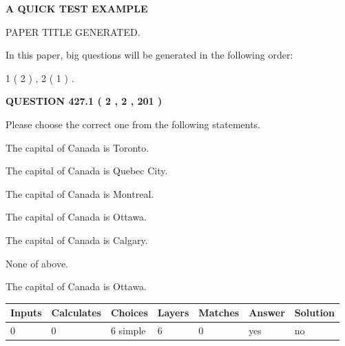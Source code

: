 \documentclass[12pt]{article}
\begin{document}
   
 \vspace{0.2in}
{\LARGE {\textbf{ A QUICK TEST EXAMPLE}}}
   
   
 PAPER TITLE GENERATED.
   
   
   
\vspace{0.2in}
   
In this paper, big questions will be generated in the following order: 
   
   
   1 ( 2 )
 ,
   2 ( 1 )
 .
  
\vspace{0.2in}
  
{\textbf{\Large{QUESTION
427.1 
 ( 2 , 2 , 201 )
}}}
  
  
Please choose the correct one from the following statements.
 
 
The capital of Canada is Toronto.
 
 
The capital of Canada is Quebec City.
 
 
The capital of Canada is Montreal.
 
 
The capital of Canada is Ottawa.
 
 
The capital of Canada is Calgary.
 
 
 None of above.
 
 
\noindent{}
 
 
The capital of Canada is Ottawa.
 
 
\noindent{}
 
 
   
   
   
   
\noindent\begin{tabular}{|l|l|l|l|l|l|l|}
 \hline
Inputs & Calculates & Choices & Layers & Matches & Answer & Solution \\ \hline
 0  & 
 0  & 
 6
  simple  
  & 
 6  & 
 0  & 
  yes & 
  no 
  \\ \hline
 \end{tabular}
   
   
   
   
\noindent{}
   
\end{document}
